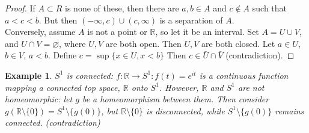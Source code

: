 \documentclass{article}
\newcommand{\R}{\mathbb{R}}
\newtheorem{example}{Example}
\begin{document}
\begin{proof}
	If $A\subset R$ is none of these, then there are $a,b \in A$ and $c\not\in A$ such that $a<c<b$.  But then $(-\infty,c)\cup(c,\infty)$ is a separation of $A$.\\Conversely, assume $A$ is not a point or $\R$, so let it be an interval.  Set $A=U\cup V$, and $U\cap V=\varnothing$, where $U,V$ are both open.  Then $U,V$ are both closed.  Let $a\in U$, $b\in V$, $a<b$.  Define $c=\sup\{x\in U,x<b\}$ Then $c\in \bar{U}\cap\bar{V}$ (contradiction).
	\end{proof}
\begin{example}
	$S^1$ is connected: $f: \R\rightarrow S^1: f(t) = e^{it}$ is a continuous function mapping a connected top space, $\R$ onto $S^1$.
	However, $\R$ and $S^1$ are not homeomorphic: let $g$ be a homeomorphism between them.  Then consider $g(\R\setminus\{0\}) = S^1\setminus\{g(0)\}$, but $\R\setminus\{0\}$ is disconnected, while $S^1\setminus\{g(0)\}$ remains connected. (contradiction)
\end{example}
\end{document}
